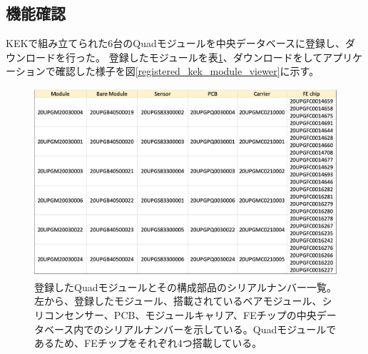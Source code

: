 \subsection{機能確認}
KEKで組み立てられた6台のQuadモジュールを中央データベースに登録し、ダウンロードを行った。
登録したモジュールを表\ref{registered_kek_module}、ダウンロードをしてアプリケーションで確認した様子を図\ref{registered_kek_module_viewer}に示す。

\begin{figure}[bpt]\centering
\includegraphics[width=12cm]{registered_kek_module}
\caption[登録したQuadモジュールと構成部品のシリアルナンバー一覧。]{登録したQuadモジュールとその構成部品のシリアルナンバー一覧。左から、登録したモジュール、搭載されているベアモジュール、シリコンセンサー、PCB、モジュールキャリア、FEチップの中央データベース内でのシリアルナンバーを示している。Quadモジュールであるため、FEチップをそれぞれ4つ搭載している。}
\label{registered_kek_module}
\end{figure}

